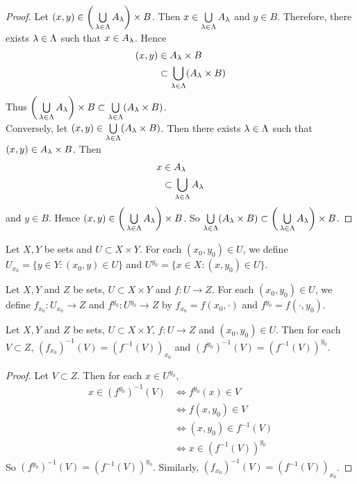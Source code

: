 \documentclass{book}
\begin{document}
	\begin{proof}
		Let $(x,y) \in \bigg( \bigcup\limits_{\lambda \in \Lambda} A_{\lambda} \bigg) \times B$. Then $x \in \bigcup\limits_{\lambda \in \Lambda} A_{\lambda}$ and $y \in B$. Therefore, there exists $\lambda \in \Lambda$ such that $x \in A_{\lambda}$. Hence 
		\begin{align*}
			(x,y) 
			& \in A_{\lambda} \times B \\
			& \subset \bigcup\limits_{\lambda \in \Lambda} (A_{\lambda} \times B)
		\end{align*}
		Thus $\bigg( \bigcup\limits_{\lambda \in \Lambda} A_{\lambda} \bigg) \times B \subset  \bigcup\limits_{\lambda \in \Lambda} (A_{\lambda} \times B)$. \\
		Conversely, let $(x,y) \in \bigcup\limits_{\lambda \in \Lambda} (A_{\lambda} \times B)$. Then there exists $\lambda \in \Lambda$ such that $(x,y) \in A_{\lambda} \times B$. Then 
		\begin{align*}
			x 
			& \in A_{\lambda} \\
			& \subset \bigcup_{\lambda \in \Lambda} A_{\lambda}
		\end{align*}
		and $y \in B$. Hence $(x,y) \in \bigg( \bigcup\limits_{\lambda \in \Lambda} A_{\lambda} \bigg) \times B$. So $ \bigcup\limits_{\lambda \in \Lambda} (A_{\lambda} \times B) \subset \bigg( \bigcup\limits_{\lambda \in \Lambda} A_{\lambda} \bigg) \times B$.
	\end{proof}

	\begin{defn}
		Let $X, Y$ be sets and $U \subset X \times Y$. For each $(x_0, y_0) \in U$, we define $U_{x_0} = \{y \in Y: (x_0,y) \in U\}$ and $U^{y_0} = \{x \in X: (x,y_0) \in U\}$.
	\end{defn}

	\begin{defn}
		Let $X, Y$ and $Z$ be sets, $U \subset X \times Y$ and $f: U \rightarrow Z$. For each $(x_0, y_0) \in U$, we define $f_{x_0}: U_{x_0} \rightarrow Z$ and $f^{y_0}: U^{y_0} \rightarrow Z$ by $f_{x_0} = f(x_0, \cdot)$ and $f^{y_0} = f(\cdot, y_0)$.
	\end{defn}
	
	\begin{ex}
		Let $X, Y$ and $Z$ be sets, $U \subset X \times Y$, $f: U \rightarrow Z$ and $(x_0, y_0) \in U$. Then for each $V \subset Z$, $(f_{x_0})^{-1}(V) = (f^{-1}(V))_{x_0}$ and $(f^{y_0})^{-1}(V) = (f^{-1}(V))^{y_0}$.
	\end{ex}

	\begin{proof}
		Let $V \subset Z$. Then for each $x \in U^{y_0}$,
		\begin{align*}
			x \in (f^{y_0})^{-1}(V) 
			& \iff f^{y_0}(x) \in V \\
			& \iff f(x, y_0) \in V \\
			& \iff (x, y_0) \in f^{-1}(V) \\
			& \iff x \in (f^{-1}(V))^{y_0}
		\end{align*}
		So $(f^{y_0})^{-1}(V) = (f^{-1}(V))^{y_0}$. Similarly, $(f_{x_0})^{-1}(V) = (f^{-1}(V))_{x_0}$. 
	\end{proof}
	
\end{document}
